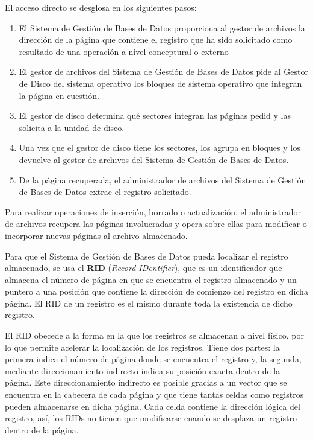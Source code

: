 \documentclass[10pt,a4paper,spanish]{report}
\begin{document}
El acceso directo se desglosa en los siguientes pasos:



\begin{enumerate}
    \item El Sistema de Gestión de Bases de Datos proporciona al gestor de archivos la dirección de la página que contiene el registro que ha sido solicitado como resultado de una operación a nivel conceptural o externo
    \item El gestor de archivos del Sistema de Gestión de Bases de Datos pide al Gestor de Disco del sistema operativo los bloques de sistema operativo que integran la página en cuestión.
    \item El gestor de disco determina qué sectores integran las páginas pedid y las solicita a la unidad de disco.
    \item Una vez que el gestor de disco tiene los sectores, los agrupa en bloques y los devuelve al gestor de archivos del Sistema de Gestión de Bases de Datos.
    \item De la página recuperada, el administrador de archivos del Sistema de Gestión de Bases de Datos extrae el registro solicitado.
\end{enumerate}

Para realizar operaciones de inserción, borrado o actualización, el administrador de archivos recupera las páginas involucradas y opera sobre ellas para modificar o incorporar nuevas páginas al archivo almacenado.

Para que el Sistema de Gestión de Bases de Datos pueda localizar el registro almacenado, se usa el \textbf{\textcolor[rgb]{1,0.2,0.3}{RID}} (\textit{\textcolor[rgb]{1,0.2,0.3}{Record IDentifier}}), que es un identificador que almacena el número de página en que se encuentra el registro almacenado y un puntero a una posición que contiene la dirección de comienzo del registro en dicha página. El RID de un registro es el mismo durante toda la existencia de dicho registro.

El RID obecede a la forma en la que los registros se almacenan a nivel físico, por lo que permite acelerar la localización de los registros. Tiene dos partes: la primera indica el número de página donde se encuentra el registro y, la segunda, mediante direccionamiento indirecto indica su posición exacta dentro de la página. Este direccionamiento indirecto es posible gracias a un vector que se encuentra en la cabecera de cada página y que tiene tantas celdas como registros pueden almacenarse en dicha página. Cada celda contiene la dirección lógica del registro, así, los RIDs no tienen que modificarse cuando se desplaza un registro dentro de la página.
\end{document}
